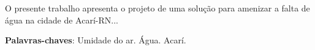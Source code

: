 \begin{resumo}
 O presente trabalho apresenta o projeto de uma solução para amenizar a falta de água na cidade de Acarí-RN...

 \vspace{\onelineskip}
    
 \noindent
 \textbf{Palavras-chaves}: Umidade do ar. Água. Acarí.
\end{resumo}
